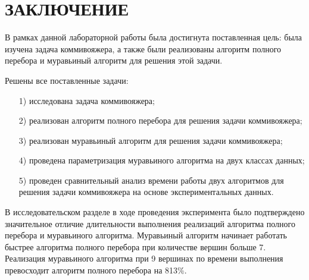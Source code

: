 {\centering \chapter*{ЗАКЛЮЧЕНИЕ}}

В рамках данной лабораторной работы была достигнута поставленная цель: была изучена задача коммивояжера, а также были реализованы алгоритм полного перебора и муравьиный алгоритм для решения этой задачи.

Решены все поставленные задачи:
\begin{enumerate}
	\item[1)] исследована задача коммивояжера;
	\item[2)] реализован алгоритм полного перебора для решения задачи коммивояжера;
	\item[3)] реализован муравьиный алгоритм для решения задачи коммивояжера;
	\item[4)] проведена параметризация муравьиного алгоритма на двух классах данных;
	\item[5)] проведен сравнительный анализ времени работы двух алгоритмов для решения задачи коммивояжера на основе экспериментальных данных.
\end{enumerate}

В исследовательском разделе в ходе проведения эксперимента было подтверждено значительное отличие длительности выполнения реализаций алгоритма полного перебора и муравьиного алгоритма.
Муравьиный алгоритм начинает работать быстрее алгоритма полного перебора при количестве вершин больше 7.
Реализация муравьиного алгоритма при 9 вершинах по времени выполнения превосходит алгоритм полного перебора на 813\%.